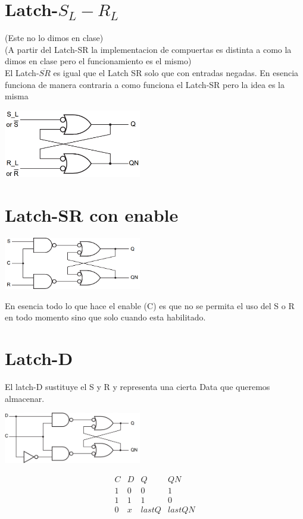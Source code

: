 \documentclass{report}
\begin{document}
\section{Latch-$S_L-R_L$}

 (Este no lo dimos en clase) \\
(A partir del Latch-SR la implementacion de compuertas es distinta a como la dimos en clase pero el funcionamiento es el mismo)\\
El Latch-$\overline{SR}$ es igual que el Latch SR solo que con entradas negadas. En esencia funciona de manera contraria a como funciona el Latch-SR pero la idea es la misma

\includegraphics[width=6cm]{../Assets/latch-sl-rl.png}

\section{Latch-SR con enable}
\includegraphics[width=6cm]{../Assets/latch-sr-con-enable.png}

En esencia todo lo que hace el enable (C) es que no se permita el uso del S o R en todo momento sino que solo cuando esta habilitado.


\section{Latch-D}
El latch-D sustituye el S y R y representa una cierta Data que queremos almacenar.

\includegraphics[width=6cm]{../Assets/latch-d.png}

$$\begin{array}{cc|cc}
		C & D & Q     & QN     \\ \hline
		1 & 0 & 0     & 1      \\
		1 & 1 & 1     & 0      \\
		0 & x & lastQ & lastQN \\
	\end{array}$$ \\
\end{document}
